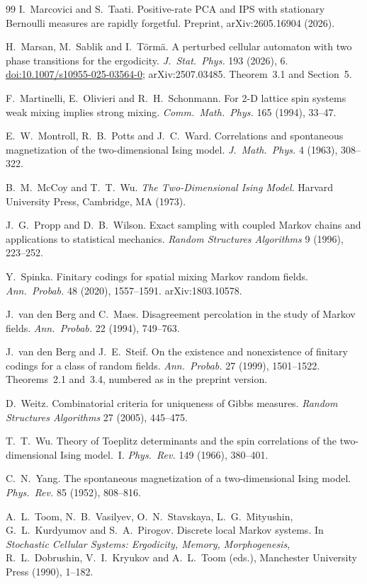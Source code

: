 \documentclass[11pt]{article}
\theoremstyle{plain}
\theoremstyle{definition}
\theoremstyle{remark}
\begin{document}
\begin{thebibliography}{99}
 I.~Marcovici and S.~Taati. Positive-rate PCA and IPS with stationary Bernoulli measures are rapidly forgetful. Preprint, arXiv:2605.16904 (2026).

 H.~Marsan, M.~Sablik and I.~T\"orm\"a. A perturbed cellular automaton with two phase transitions for the ergodicity. \emph{J.\ Stat.\ Phys.} 193 (2026), 6. \href{https://doi.org/10.1007/s10955-025-03564-0}{doi:10.1007/s10955-025-03564-0}; arXiv:2507.03485. Theorem~3.1 and Section~5.

 F.~Martinelli, E.~Olivieri and R.~H.~Schonmann. For 2-D lattice spin systems weak mixing implies strong mixing. \emph{Comm.\ Math.\ Phys.} 165 (1994), 33--47.

 E.~W.~Montroll, R.~B.~Potts and J.~C.~Ward. Correlations and spontaneous magnetization of the two-dimensional Ising model. \emph{J.\ Math.\ Phys.} 4 (1963), 308--322.

 B.~M.~McCoy and T.~T.~Wu. \emph{The Two-Dimensional Ising Model}. Harvard University Press, Cambridge, MA (1973).

 J.~G.~Propp and D.~B.~Wilson. Exact sampling with coupled Markov chains and applications to statistical mechanics. \emph{Random Structures Algorithms} 9 (1996), 223--252.

 Y.~Spinka. Finitary codings for spatial mixing Markov random fields. \emph{Ann.\ Probab.} 48 (2020), 1557--1591. arXiv:1803.10578.

 J.~van den Berg and C.~Maes. Disagreement percolation in the study of Markov fields. \emph{Ann.\ Probab.} 22 (1994), 749--763.

 J.~van den Berg and J.~E.~Steif. On the existence and nonexistence of finitary codings for a class of random fields. \emph{Ann.\ Probab.} 27 (1999), 1501--1522. Theorems~2.1 and~3.4, numbered as in the preprint version.

 D.~Weitz. Combinatorial criteria for uniqueness of Gibbs measures. \emph{Random Structures Algorithms} 27 (2005), 445--475.

 T.~T.~Wu. Theory of Toeplitz determinants and the spin correlations of the two-dimensional Ising model.~I. \emph{Phys.\ Rev.} 149 (1966), 380--401.

 C.~N.~Yang. The spontaneous magnetization of a two-dimensional Ising model. \emph{Phys.\ Rev.} 85 (1952), 808--816.

 A.~L.~Toom, N.~B.~Vasilyev, O.~N.~Stavskaya, L.~G.~Mityushin, G.~L.~Kurdyumov and S.~A.~Pirogov. Discrete local Markov systems. In \emph{Stochastic Cellular Systems: Ergodicity, Memory, Morphogenesis}, R.~L.~Dobrushin, V.~I.~Kryukov and A.~L.~Toom (eds.), Manchester University Press (1990), 1--182.

\end{thebibliography}
\end{document}
